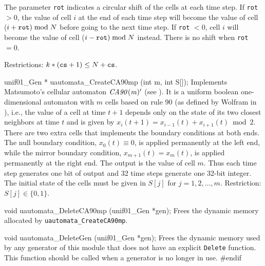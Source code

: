  The parameter {\tt rot} indicates a circular shift of the cells at
 each time step. If {\tt rot} $> 0$, the value of cell $i$ at the end
 of each time step will become the value of cell ($i+ {\tt rot}) \bmod N$
 before going to the next time step. If {\tt rot} $< 0$, cell $i$
 will become the value of cell ($i- {\tt rot}) \bmod N$  instead.
 There is no shift when {\tt rot} $= 0$.

 Restrictions: $k*({\tt cs} + 1) \le N+ {\tt cs}$.
 \endtab
\code


unif01_Gen * uautomata_CreateCA90mp (int m, int S[]);
\endcode
 \tab Implements Matsumoto's cellular automaton ${\it CA90(m)'}$
  (see \cite{rMAT98b}). %
  It is a uniform boolean one-dimensio\-nal automaton with $m$ cells based on
  rule 90 (as defined by Wolfram in \cite{rWOL83a}), i.e., the value of a
  cell at time $t+1$
  depends only on the state of its two closest neighbors  at time $t$ and
  is given by $x_i(t+1) = x_{i-1}(t) + x_{i+1}(t) \bmod 2$. There are two
  extra cells that implements the boundary conditions at both ends.
  The null boundary condition, $x_0(t) \equiv 0$, is applied permanently
  at the left end, while the mirror boundary condition,
  $x_{m+1}(t) = x_{m}(t) $, is applied permanently at the right end.
  The output is the value of cell $m$. Thus each time step generates
  one bit of output and 32 time steps generate one 32-bit integer.
  The initial state of the cells must be given in $S[j]$ for
  $j = 1, 2, \ldots, m$. Restriction: $S[j] \in \{0, 1 \}$.
 \endtab



\code

void uautomata_DeleteCA90mp (unif01_Gen *gen);
\endcode
  \tab Frees the dynamic memory allocated by
   {\tt uautomata\_CreateCA90mp}.
 \endtab
\code


void uautomata_DeleteGen (unif01_Gen *gen);
\endcode
 \tab  Frees the dynamic memory used by any generator of this module
  that does not have an explicit {\tt Delete} function.
  This function should be called when a generator
  is no longer in use.
 \endtab
\code\hide
#endif
\endhide\endcode
